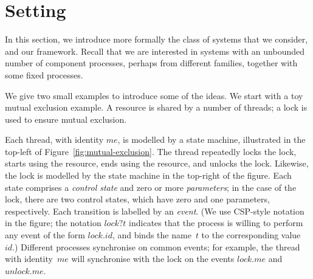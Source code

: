 \def\Node{Nd}
\def\Lock{Lk}
\def\Head{Hd}
\def\Last{Lt}
\def\Con{C}
\def\InitNode{InitNd}

\section{Setting}
\label{sec:setting}

In this section, we introduce more formally the class of systems that we
consider, and our framework.  Recall that we are interested in systems with an
unbounded number of component processes, perhaps from different families,
together with some fixed processes.

We give two small examples to introduce some of the ideas.  We start with a
toy mutual exclusion example.  A resource is shared by a number of threads; a
lock is used to ensure mutual exclusion.

Each thread, with identity $me$, is modelled by a state machine, illustrated
in the top-left of Figure~\ref{fig:mutual-exclusion}.  The thread repeatedly
locks the lock, starts using the resource, ends using the resource, and
unlocks the lock.  Likewise, the lock is modelled by the state machine in the
top-right of the figure.
%
Each state comprises a \emph{control state} and zero or
more \emph{parameters}; in the case of the lock, there are two control states,
which have zero and one parameters, respectively.  Each transition is labelled
by an \emph{event}. (We use CSP-style notation in the figure; the notation
$lock?t$ indicates that the process is willing to perform any event of the
form $lock.id$, and binds the name~$t$ to the corresponding value~$id$.)
Different processes synchronise on common events; for example, the thread with
identity~$me$ will synchronise with the lock on the events $lock.me$ and
$unlock.me$.



